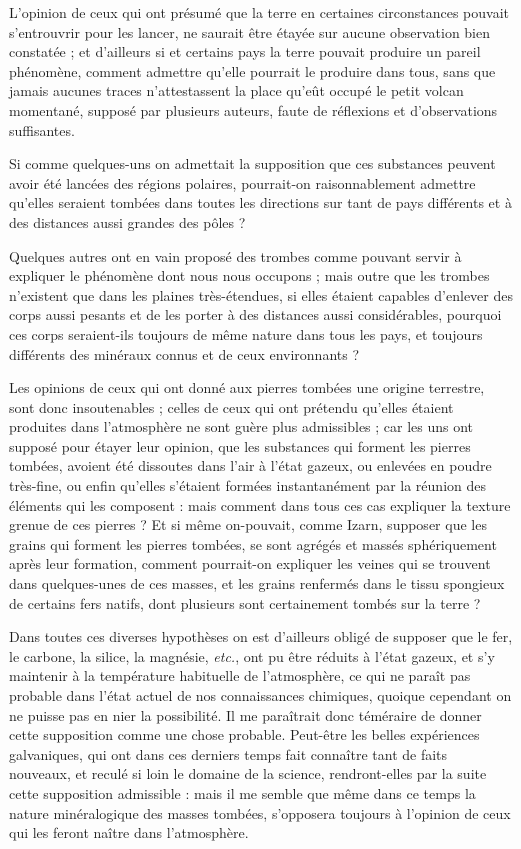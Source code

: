 \documentclass[a4paper, 12pt, oneside, french]{article}
\begin{document}
L'opinion de ceux qui ont présumé que la terre en certaines circonstances pouvait s'entrouvrir pour les lancer, ne saurait être étayée sur aucune observation bien constatée ; et d'ailleurs si et certains pays la terre pouvait produire un pareil phénomène, comment admettre qu'elle pourrait le produire dans tous, sans que jamais aucunes traces n'attestassent la place qu'eût occupé le petit volcan momentané, supposé par plusieurs auteurs, faute de réflexions et d'observations suffisantes.

Si comme quelques-uns on admettait la supposition que ces substances peuvent avoir été lancées des régions polaires, pourrait-on raisonnablement admettre qu'elles seraient tombées dans toutes les directions sur tant de pays différents et à des distances aussi grandes des pôles ?

Quelques autres ont en vain proposé des trombes comme pouvant servir à expliquer le phénomène dont nous nous occupons ; mais outre que les trombes n'existent que dans les plaines très-étendues, si elles étaient capables d'enlever des corps aussi pesants et de les porter à des distances aussi considérables, pourquoi ces corps seraient-ils toujours de même nature dans tous les pays, et toujours différents des minéraux connus et de ceux environnants ?

Les opinions de ceux qui ont donné aux pierres tombées une origine terrestre, sont donc insoutenables ; celles de ceux qui ont prétendu qu'elles étaient produites dans l'atmosphère ne sont guère plus admissibles ; car les uns ont supposé pour étayer leur opinion, que les substances qui forment les pierres tombées, avoient été dissoutes dans l'air à l'état gazeux, ou enlevées en poudre très-fine, ou enfin qu'elles s'étaient formées instantanément par la réunion des éléments qui les composent : mais comment dans tous ces cas expliquer la texture grenue de ces pierres ? Et si même on-pouvait, comme Izarn, supposer que les grains qui forment les pierres tombées, se sont agrégés et massés sphériquement après leur formation, comment pourrait-on expliquer les veines qui se trouvent dans quelques-unes de ces masses, et les grains renfermés dans le tissu spongieux de certains fers natifs, dont plusieurs sont certainement tombés sur la terre ?

Dans toutes ces diverses hypothèses on est d'ailleurs obligé de supposer que le fer, le carbone, la silice, la magnésie, \emph{etc.}, ont pu être réduits à l'état gazeux, et s'y maintenir à la température habituelle de l'atmosphère, ce qui ne paraît pas probable dans l'état actuel de nos connaissances chimiques, quoique cependant on ne puisse pas en nier la possibilité. Il me paraîtrait donc téméraire de donner cette supposition comme une chose probable. Peut-être les belles expériences galvaniques, qui ont dans ces derniers temps fait connaître tant de faits nouveaux, et reculé si loin le domaine de la science, rendront-elles par la suite cette supposition admissible : mais il me semble que même dans ce temps la nature minéralogique des masses tombées, s'opposera toujours à l'opinion de ceux qui les feront naître dans l'atmosphère.
\end{document}

